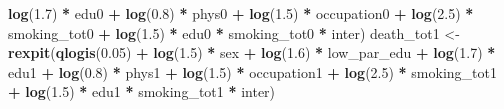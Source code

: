 \documentclass[
]{book}
\newenvironment{Shaded}{\begin{snugshade}}{\end{snugshade}}
\newcommand{\FloatTok}[1]{\textcolor[rgb]{0.00,0.00,0.81}{#1}}
\newcommand{\FunctionTok}[1]{\textcolor[rgb]{0.13,0.29,0.53}{\textbf{#1}}}
\newcommand{\NormalTok}[1]{#1}
\newcommand{\OtherTok}[1]{\textcolor[rgb]{0.56,0.35,0.01}{#1}}
\newcommand{\SpecialCharTok}[1]{\textcolor[rgb]{0.81,0.36,0.00}{\textbf{#1}}}
\begin{document}
\begin{Shaded}
\begin{Highlighting}[]
                         \FunctionTok{log}\NormalTok{(}\FloatTok{1.7}\NormalTok{) }\SpecialCharTok{*}\NormalTok{ edu0 }\SpecialCharTok{+} \FunctionTok{log}\NormalTok{(}\FloatTok{0.8}\NormalTok{) }\SpecialCharTok{*}\NormalTok{ phys0 }\SpecialCharTok{+} \FunctionTok{log}\NormalTok{(}\FloatTok{1.5}\NormalTok{) }\SpecialCharTok{*}\NormalTok{ occupation0 }\SpecialCharTok{+} 
                         \FunctionTok{log}\NormalTok{(}\FloatTok{2.5}\NormalTok{) }\SpecialCharTok{*}\NormalTok{ smoking\_tot0 }\SpecialCharTok{+} \FunctionTok{log}\NormalTok{(}\FloatTok{1.5}\NormalTok{) }\SpecialCharTok{*}\NormalTok{ edu0 }\SpecialCharTok{*}\NormalTok{ smoking\_tot0 }\SpecialCharTok{*}\NormalTok{ inter)}
\NormalTok{  death\_tot1 }\OtherTok{\textless{}{-}} \FunctionTok{rexpit}\NormalTok{(}\FunctionTok{qlogis}\NormalTok{(}\FloatTok{0.05}\NormalTok{) }\SpecialCharTok{+} \FunctionTok{log}\NormalTok{(}\FloatTok{1.5}\NormalTok{) }\SpecialCharTok{*}\NormalTok{ sex  }\SpecialCharTok{+} \FunctionTok{log}\NormalTok{(}\FloatTok{1.6}\NormalTok{) }\SpecialCharTok{*}\NormalTok{ low\_par\_edu }\SpecialCharTok{+} 
                         \FunctionTok{log}\NormalTok{(}\FloatTok{1.7}\NormalTok{) }\SpecialCharTok{*}\NormalTok{ edu1 }\SpecialCharTok{+} \FunctionTok{log}\NormalTok{(}\FloatTok{0.8}\NormalTok{) }\SpecialCharTok{*}\NormalTok{ phys1 }\SpecialCharTok{+} \FunctionTok{log}\NormalTok{(}\FloatTok{1.5}\NormalTok{) }\SpecialCharTok{*}\NormalTok{ occupation1 }\SpecialCharTok{+} 
                         \FunctionTok{log}\NormalTok{(}\FloatTok{2.5}\NormalTok{) }\SpecialCharTok{*}\NormalTok{ smoking\_tot1 }\SpecialCharTok{+} \FunctionTok{log}\NormalTok{(}\FloatTok{1.5}\NormalTok{) }\SpecialCharTok{*}\NormalTok{ edu1 }\SpecialCharTok{*}\NormalTok{ smoking\_tot1 }\SpecialCharTok{*}\NormalTok{ inter)}


\end{Highlighting}
\end{Shaded}
\end{document}
